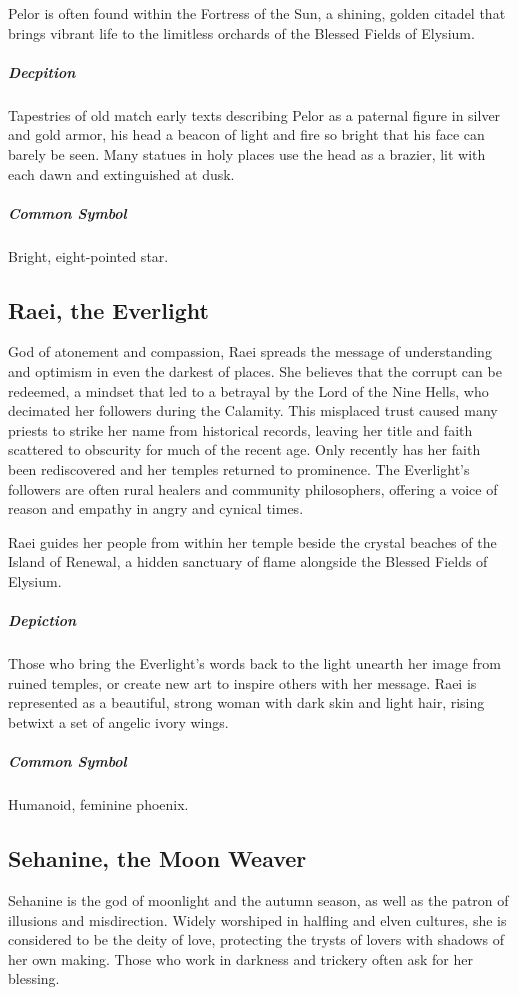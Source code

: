 \documentclass[letterpaper,twocolumn,openany,nodeprecatedcode]{dndbook}
\begin{document}
Pelor is often found within the Fortress of the Sun, a shining, golden citadel that brings
vibrant life to the limitless orchards of the Blessed Fields of Elysium.

\subparagraph{Decpition}
Tapestries of old match early texts describing Pelor as a paternal figure in silver and
gold armor, his head a beacon of light and fire so bright that his face can barely be seen.
Many statues in holy places use the head as a brazier, lit with each dawn and extinguished
at dusk.

\subparagraph{Common Symbol}
Bright, eight-pointed star.

\subsection{Raei, the Everlight}

God of atonement and compassion, Raei spreads the message of understanding and optimism in
even the darkest of places. She believes that the corrupt can be redeemed, a mindset that led
to a betrayal by the Lord of the Nine Hells, who decimated her followers during the Calamity.
This misplaced trust caused many priests to strike her name from historical records, leaving
her title and faith scattered to obscurity for much of the recent age. Only recently has her
faith been rediscovered and her temples returned to prominence. The Everlight’s followers are
often rural healers and community philosophers, offering a voice of reason and empathy in
angry and cynical times.

Raei guides her people from within her temple beside the crystal beaches of the Island of
Renewal, a hidden sanctuary of flame alongside the Blessed Fields of Elysium.

\subparagraph{Depiction}
Those who bring the Everlight’s words back to the light unearth her image from ruined temples,
or create new art to inspire others with her message. Raei is represented as a beautiful,
strong woman with dark skin and light hair, rising betwixt a set of angelic ivory wings.

\subparagraph{Common Symbol}
Humanoid, feminine phoenix.

\subsection{Sehanine, the Moon Weaver}

Sehanine is the god of moonlight and the autumn season, as well as the patron of illusions
and misdirection. Widely worshiped in halfling and elven cultures, she is considered to be
the deity of love, protecting the trysts of lovers with shadows of her own making. Those who
work in darkness and trickery often ask for her blessing.
\end{document}
